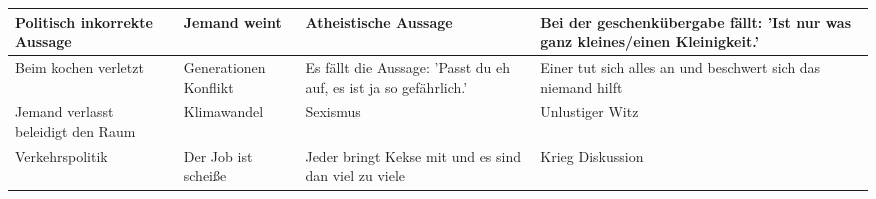 \begin{table}[h]
\begin{tabularx}{\linewidth}{|X|X|X|X|}
\hline
Politisch inkorrekte Aussage & Jemand weint & Atheistische Aussage & Bei der geschenkübergabe fällt: 'Ist nur was ganz kleines/einen Kleinigkeit.' \\ \hline
Beim kochen verletzt & Generationen Konflikt & Es fällt die Aussage: 'Passt du eh auf, es ist ja so gefährlich.' & Einer tut sich alles an und beschwert sich das niemand hilft \\ \hline
Jemand verlasst beleidigt den Raum & Klimawandel & Sexismus & Unlustiger Witz \\ \hline
Verkehrspolitik & Der Job ist scheiße & Jeder bringt Kekse mit und es sind dan viel zu viele & Krieg Diskussion \\ \hline
\end{tabularx}
\end{table}
